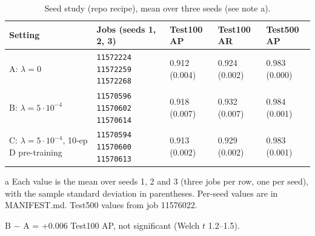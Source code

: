 \documentclass[10pt]{article}
\newcommand{\job}[1]{\texttt{#1}}
\begin{document}
\begin{table}[h]\centering\small
\begin{threeparttable}
\caption{Seed study (repo recipe), mean over three seeds (see note a).}
\begin{tabularx}{\linewidth}{X J l l l}
\toprule
Setting & Jobs (seeds 1, 2, 3) & Test100 AP & Test100 AR & Test500 AP \\
\midrule
A: $\lambda=0$ & \job{11572224} \job{11572259} \job{11572268} & 0.912 (0.004) & 0.924 (0.002) & 0.983 (0.000) \\
\addlinespace
B: $\lambda=5\cdot10^{-4}$ & \job{11570596} \job{11570602} \job{11570614} & 0.918 (0.007) & 0.932 (0.007) & 0.984 (0.001) \\
\addlinespace
C: $\lambda=5\cdot10^{-4}$, 10-ep D pre-training & \job{11570594} \job{11570600} \job{11570613} & 0.913 (0.002) & 0.929 (0.002) & 0.983 (0.001) \\
\bottomrule
\end{tabularx}
\begin{tablenotes}\footnotesize
\item[a] Each value is the mean over seeds 1, 2 and 3 (three jobs per row, one per seed), with the sample standard deviation in parentheses. Per-seed values are in MANIFEST.md. Test500 values from job 11576022.
\item B $-$ A = +0.006 Test100 AP, not significant (Welch $t$ 1.2--1.5).
\end{tablenotes}
\end{threeparttable}
\end{table}
\end{document}
